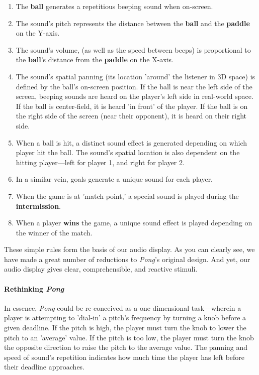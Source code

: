 \documentclass{report}
\newcommand{\state}[1]{\textbf{#1}}
\newcommand{\pad}{\textbf{paddle}\xspace}
\newcommand{\ball}{\textbf{ball}\xspace}
\begin{document}
\begin{enumerate}
    \item The \ball generates a repetitious beeping sound when on-screen.
    \item The sound's pitch represents the distance between the \ball and the \pad on the Y-axis.
    \item The sound's volume, (as well as the speed between beeps) is proportional to the \ball's distance from the \pad on the X-axis.
    \item The sound's spatial panning (its location 'around' the listener in 3D space) is defined by the ball's on-screen position. If the ball is near the left side of the screen, beeping sounds are heard on the player's left side in real-world space. If the ball is center-field, it is heard 'in front' of the player. If the ball is on the right side of the screen (near their opponent), it is heard on their right side.  
    \item When a ball is hit, a distinct sound effect is generated depending on which player hit the ball. The sound's spatial location is also dependent on the hitting player---left for player 1, and right for player 2.
    \item In a similar vein, goals generate a unique sound for each player.
    \item When the game is at 'match point,' a special sound is played during the \state{intermission}.
    \item When a player \state{wins} the game, a unique sound effect is played depending on the winner of the match.
\end{enumerate}

These simple rules form the basis of our audio display. As you can clearly see, we have made a great number of reductions to \emph{Pong}'s original design. And yet, our audio display gives clear, comprehensible, and reactive stimuli. 

\paragraph{Rethinking \emph{Pong}}

In essence, \emph{Pong} could be re-conceived as a one dimensional task---wherein a player is attempting to 'dial-in' a pitch's frequency by turning a knob before a given deadline. If the pitch is high, the player must turn the knob to lower the pitch to an 'average' value. If the pitch is too low, the player must turn the knob the opposite direction to raise the pitch to the average value. The panning and speed of sound's repetition indicates how much time the player has left before their deadline approaches.
\end{document}
